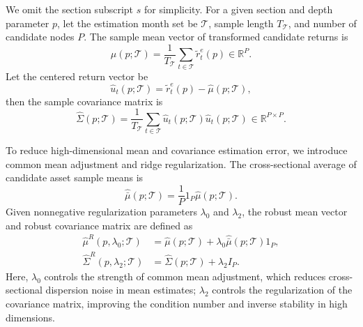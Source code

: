 \documentclass[12pt]{article}
\def\bm#1{#1}%
\def\top{}%
\begin{document}
We omit the section subscript \(s\) for simplicity. For a given section and depth parameter \(p\), let the estimation month set be \(\mathcal T\), sample length \(T_{\mathcal T}\), and number of candidate nodes \(P\). The sample mean vector of transformed candidate returns is
\begin{equation}
  \widehat{\bm\mu}(p;\mathcal T)
  =
  \frac{1}{T_{\mathcal T}}
  \sum_{t\in\mathcal T}
  \widetilde{\bm r}_{t}^{e}(p)
  \in\mathbb R^P.
  \label{eq:sample_mean}
\end{equation}
Let the centered return vector be
\begin{equation}
  \widehat{\bm u}_{t}(p;\mathcal T)
  =
  \widetilde{\bm r}_{t}^{e}(p)
  -\widehat{\bm\mu}(p;\mathcal T),
  \label{eq:centered_return}
\end{equation}
then the sample covariance matrix is
\begin{equation}
  \widehat{\bm\Sigma}(p;\mathcal T)
  =
  \frac{1}{T_{\mathcal T}}
  \sum_{t\in\mathcal T}
  \widehat{\bm u}_{t}(p;\mathcal T)
  \widehat{\bm u}_{t}(p;\mathcal T)^{\top}
  \in\mathbb R^{P\times P}.
  \label{eq:sample_covariance}
\end{equation}

To reduce high-dimensional mean and covariance estimation error, we introduce common mean adjustment and ridge regularization. The cross-sectional average of candidate asset sample means is
\begin{equation}
  \widehat{\bar\mu}(p;\mathcal T)
  =
  \frac{1}{P}
  \bm 1_P^{\top}\widehat{\bm\mu}(p;\mathcal T).
  \label{eq:cross_sectional_mean}
\end{equation}
Given nonnegative regularization parameters \(\lambda_0\) and \(\lambda_2\), the robust mean vector and robust covariance matrix are defined as
\begin{align}
  \widehat{\bm\mu}^{R}(p,\lambda_0;\mathcal T)
  &=
  \widehat{\bm\mu}(p;\mathcal T)
  +\lambda_0\widehat{\bar\mu}(p;\mathcal T)\bm 1_P,
  \label{eq:robust_mean}\\
  \widehat{\bm\Sigma}^{R}(p,\lambda_2;\mathcal T)
  &=
  \widehat{\bm\Sigma}(p;\mathcal T)
  +\lambda_2\bm I_P.
  \label{eq:robust_covariance}
\end{align}
Here, \(\lambda_0\) controls the strength of common mean adjustment, which reduces cross-sectional dispersion noise in mean estimates; \(\lambda_2\) controls the regularization of the covariance matrix, improving the condition number and inverse stability in high dimensions.
\end{document}
